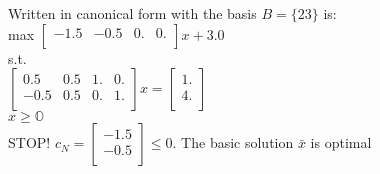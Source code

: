 \documentclass{article}
\begin{document}
Written in canonical form with the basis $B = \{2 3\}$ is: \\

max $\begin{bmatrix}
  -1.5 & -0.5 & 0. & 0.\\
\end{bmatrix}x + 3.0$ \\

s.t. \\
$\begin{bmatrix}
  0.5 & 0.5 & 1. & 0.\\
  -0.5 & 0.5 & 0. & 1.\\
\end{bmatrix}x = \begin{bmatrix}
  1.\\
  4.\\
\end{bmatrix}$\\
$x \geq\mathbb{O}$ \\

STOP! $c_N = \begin{bmatrix}
  -1.5\\
  -0.5\\
\end{bmatrix} \leq 0$. The basic solution $\bar{x}$ is optimal
\end{document}
